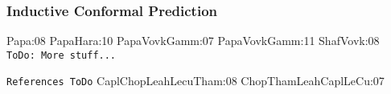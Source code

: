 \subsubsection{Inductive Conformal Prediction} \label{sss:ref_conformal_prediction}
\cite{art}{Papa:08}
\cite{art}{PapaHara:10}
\cite{art}{PapaVovkGamm:07}
\cite{art}{PapaVovkGamm:11}
\cite{art}{ShafVovk:08}
\texttt{ToDo: More stuff...}


\texttt{References ToDo}
\cite{art}{CaplChopLeahLecuTham:08}
\cite{art}{ChopThamLeahCaplLeCu:07}


